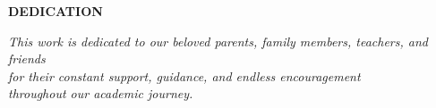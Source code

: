 \vspace*{0.6cm}
\begin{center}
    \fontsize{16}{19}\selectfont
    \textbf{DEDICATION}\\[0.5cm]
\end{center}

\vspace{1.5cm}

{
\fontsize{12}{14}\selectfont
\noindent
\begin{center}
    \textit{This work is dedicated to our beloved parents, family members, teachers, and friends }\\
    \textit{for their constant support, guidance, and endless encouragement}\\
    \textit{throughout our academic journey.}
\end{center}
}